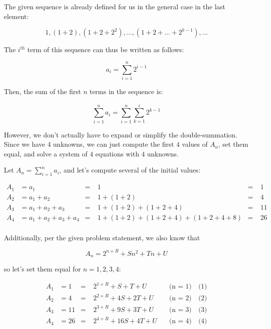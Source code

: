 The given sequence is already defined for us in the general case in the last
element:

$$ 1, (1 + 2), (1 + 2 + 2^2), ..., \textbf{$(1 + 2 + ... + 2^{k - 1})$}, ... $$

The $i^{th}$ term of this sequence can thus be written as follows:

$$ a_i = \sum_{i = 1}^{n} 2^{i-1} $$

Then, the sum of the first $n$ terms in the sequence is:

$$ \sum_{i = 1}^n a_i = \sum_{i = 1}^n \sum_{k = 1}^i 2^{k - 1} $$

However, we don't actually have to expand or simplify the double-summation.
Since we have $4$ unknowns, we can just compute the first $4$ values of $A_n$,
set them equal, and solve a system of $4$ equations with $4$ unknowns.

Let $A_n = \displaystyle{\sum_{i=1}^n a_i}$, and let's compute several of the
initial values:

$$
\begin{aligned}
A_1 & = a_1                   & = & \; 1                               & = & \;  1 \\
A_2 & = a_1 + a_2             & = & \; 1 + (1+2)                       & = & \;  4 \\
A_3 & = a_1 + a_2 + a_3       & = & \; 1 + (1+2) + (1+2+4)             & = & \; 11 \\
A_4 & = a_1 + a_2 + a_3 + a_4 & = & \; 1 + (1+2) + (1+2+4) + (1+2+4+8) & = & \; 26 \\
\end{aligned}
$$

Additionally, per the given problem statement, we also know that

$$A_n = 2^{n + R} + Sn^2 + Tn + U$$

so let's set them equal for $n = 1, 2, 3, 4$:

$$
\begin{aligned}
A_1 & = 1  & = & \; 2^{1 + R} +   S +  T + U & \quad \text{(n = 1)} \quad \text{(1)} \\
A_2 & = 4  & = & \; 2^{2 + R} +  4S + 2T + U & \quad \text{(n = 2)} \quad \text{(2)} \\
A_3 & = 11 & = & \; 2^{3 + R} +  9S + 3T + U & \quad \text{(n = 3)} \quad \text{(3)} \\
A_4 & = 26 & = & \; 2^{4 + R} + 16S + 4T + U & \quad \text{(n = 4)} \quad \text{(4)} \\
\end{aligned}
$$

